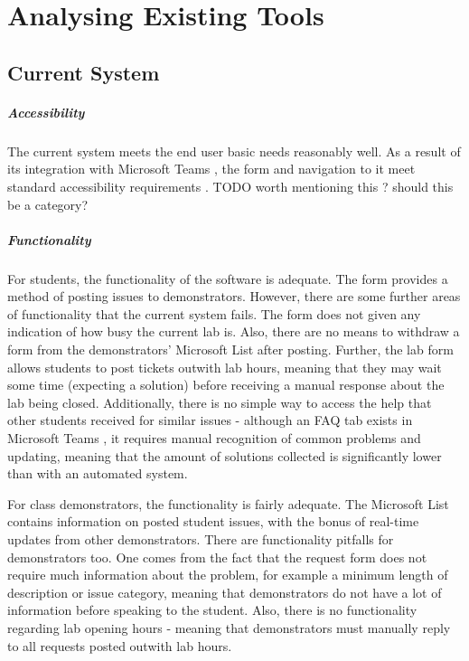 \chapter{Analysing Existing Tools}

\section{Current System}

\paragraph{Accessibility}
The current system meets the end user basic needs reasonably well. As a result of its integration with Microsoft Teams \cite{teams}, the form and navigation to it meet standard accessibility requirements \cite{formaccess} \cite{teamsaccess}. TODO worth mentioning this ? should this be a category?


\paragraph{Functionality}
For students, the functionality of the software is adequate. The form provides a method of posting issues to demonstrators. However, there are some further areas of functionality that the current system fails. The form does not given any indication of how busy the current lab is. Also, there are no means to withdraw a form from the demonstrators' Microsoft List after posting. Further, the lab form allows students to post tickets outwith lab hours, meaning that they may wait some time (expecting a solution) before receiving a manual response about the lab being closed. Additionally, there is no simple way to access the help that other students received for similar issues - although an FAQ tab exists in Microsoft Teams \cite{teams}, it requires manual recognition of common problems and updating, meaning that the amount of solutions collected is significantly lower than with an automated system. 
        
For class demonstrators, the functionality is fairly adequate. The Microsoft List contains information on posted student issues, with the bonus of real-time updates from other demonstrators. There are functionality pitfalls for demonstrators too. One comes from the fact that the request form does not require much information about the problem, for example a minimum length of description or issue category, meaning that demonstrators do not have a lot of information before speaking to the student. Also, there is no functionality regarding lab opening hours - meaning that demonstrators must manually reply to all requests posted outwith lab hours.

